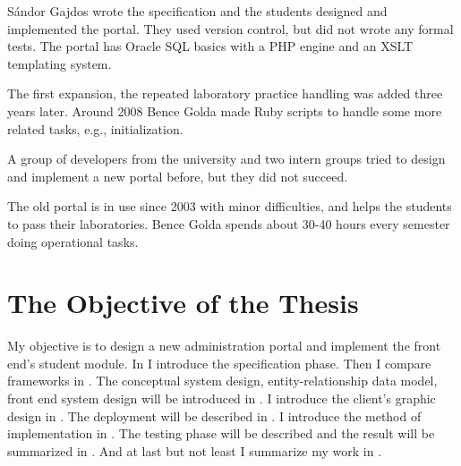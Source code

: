 Sándor Gajdos wrote the specification and the students designed and implemented the portal. They used version control, but did not wrote any formal tests. The portal has Oracle SQL basics with a PHP engine and an XSLT templating system.

The first expansion, the repeated laboratory practice handling was added three years later. Around 2008 Bence Golda made Ruby scripts to handle some more related tasks, e.g., initialization.

A group of developers from the university and two intern groups tried to design and implement a new portal before, but they did not succeed.

The old portal is in use since 2003 with minor difficulties, and helps the students to pass their laboratories. Bence Golda spends about 30-40 hours every semester doing operational tasks.

\section{The Objective of the Thesis}
My objective is to design a new administration portal and implement the front end's student module. In  I introduce the specification phase. Then I compare frameworks in . The conceptual system design, entity-relationship data model, front end system design will be introduced in . I introduce the client's graphic design in . The deployment will be described in . I introduce the method of implementation in . The testing phase will be described and the result will be summarized in . And at last but not least I summarize my work in .




